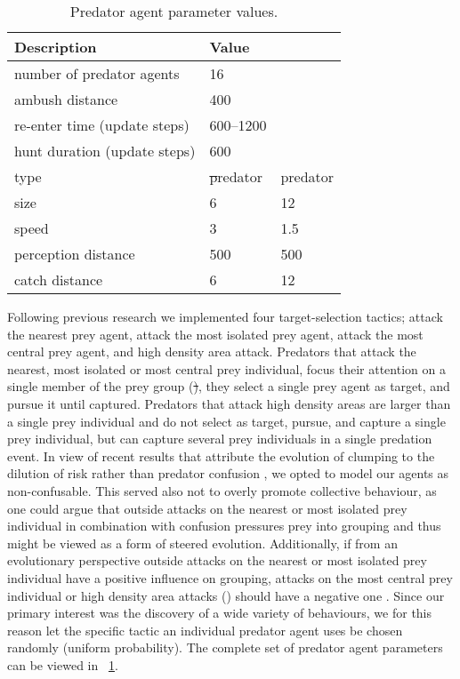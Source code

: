 \begin{table}
	\caption{Predator agent parameter values.}
	\label{tab:predator}
	\begin{tabular}{lll}
		\toprule
		Description & Value \\
		\midrule
		number of predator agents & 16 \\
		ambush distance & 400 \\
		re-enter time (update steps) & 600--\num{1200} \\
		hunt duration (update steps) & 600 \\
		\hdashline
		type & \st predator & \hda predator \\
		size & 6 & 12\\
		speed & 3 & \num{1.5}\\
		perception distance & 500 & 500 \\
		catch distance & 6 & 12\\
		\bottomrule
	\end{tabular}
\end{table}

Following previous research \cite{demsar2014simulated,demsar2015simulating,olson2016evolution} we implemented four target-selection tactics; attack the nearest prey agent, attack the most isolated prey agent, attack the most central prey agent, and high density area attack. Predators that attack the nearest, most isolated or most central prey individual, focus their attention on a single member of the prey group (\st), \ie they select a single prey agent as target, and pursue it until captured. Predators that attack high density areas are larger than a single prey individual and do not select as target, pursue, and capture a single prey individual, but can capture several prey individuals in a single predation event. In view of recent results that attribute the evolution of clumping to the dilution of risk \cite{biswas2014causes} rather than predator confusion \cite{olson2013predator}, we opted to model our agents as non-confusable. This served also not to overly promote collective behaviour, as one could argue that outside attacks on the nearest or most isolated prey individual in combination with confusion pressures prey into grouping and thus might be viewed as a form of steered evolution. Additionally, if from an evolutionary perspective outside attacks on the nearest or most isolated prey individual have a positive influence on grouping, attacks on the most central prey individual or high density area attacks (\hda) should have a negative one \cite{olson2016evolution}. Since our primary interest was the discovery of a wide variety of behaviours, we for this reason let the specific tactic an individual predator agent uses be chosen randomly (uniform probability). The complete set of predator agent parameters can be viewed in \tablename~\ref{tab:predator}.


